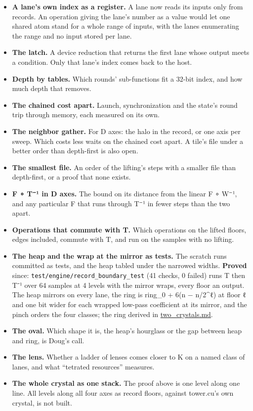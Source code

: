\begin{itemize}
\item \textbf{A lane's own index as a register.} A lane now reads its inputs only from records. An operation giving the lane's number as a value would let one shared atom stand for a whole range of inputs, with the lanes enumerating the range and no input stored per lane.
\item \textbf{The latch.} A device reduction that returns the first lane whose output meets a condition. Only that lane's index comes back to the host.
\item \textbf{Depth by tables.} Which rounds' sub-functions fit a 32-bit index, and how much depth that removes.
\item \textbf{The chained cost apart.} Launch, synchronization and the state's round trip through memory, each measured on its own.
\item \textbf{The neighbor gather.} For D axes: the halo in the record, or one axis per sweep. Which costs less waits on the chained cost apart. A tile's file under a better order than depth-first is also open.
\item \textbf{The smallest file.} An order of the lifting's steps with a smaller file than depth-first, or a proof that none exists.
\item \textbf{F ∘ T⁻¹ in D axes.} The bound on its distance from the linear F ∘ W⁻¹, and any particular F that runs through T⁻¹ in fewer steps than the two apart.
\item \textbf{Operations that commute with T.} Which operations on the lifted floors, edges included, commute with T, and run on the samples with no lifting.
\item \textbf{The heap and the wrap at the mirror as tests.} The scratch runs committed as tests, and the heap tabled under the narrowed widths. \textbf{Proved} since: \texttt{test/\allowbreak{}engine/\allowbreak{}record\_\allowbreak{}boundary\_\allowbreak{}test} (41 checks, 0 failed) runs T then T⁻¹ over 64 samples at 4 levels with the mirror wraps, every floor an output. The heap mirrors on every lane, the ring is ring\_\allowbreak{}0 + 6(n − n/2\textasciicircum{}ℓ) at floor ℓ and one bit wider for each wrapped low-pass coefficient at its mirror, and the pinch orders the four classes; the ring derived in \hyperref[chap:two-crystals]{two\_\allowbreak{}crystals.md}.
\item \textbf{The oval.} Which shape it is, the heap's hourglass or the gap between heap and ring, is Doug's call.
\item \textbf{The lens.} Whether a ladder of lenses comes closer to K on a named class of lanes, and what “tetrated resources” measures.
\item \textbf{The whole crystal as one stack.} The proof above is one level along one line. All levels along all four axes as record floors, against tower.cu's own crystal, is not built.
\end{itemize}
